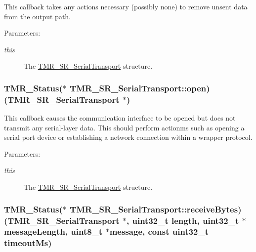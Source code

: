This callback takes any actions necessary (possibly none) to remove unsent data from the output path.

\begin{Desc}
\item[Parameters:]
\begin{description}
\item[{\em this}]The \hyperlink{struct_t_m_r___s_r___serial_transport}{TMR\_\-SR\_\-SerialTransport} structure. \end{description}
\end{Desc}
\hypertarget{struct_t_m_r___s_r___serial_transport_4971afd7c8e756b6a0ebb92a4a1997ac}{
\subsubsection[{open}]{\setlength{\rightskip}{0pt plus 5cm}TMR\_\-Status($\ast$ {\bf TMR\_\-SR\_\-SerialTransport::open})({\bf TMR\_\-SR\_\-SerialTransport} $\ast$)}}
\label{struct_t_m_r___s_r___serial_transport_4971afd7c8e756b6a0ebb92a4a1997ac}


This callback causes the communication interface to be opened but does not transmit any serial-layer data. This should perform actionms such as opening a serial port device or establishing a network connection within a wrapper protocol.

\begin{Desc}
\item[Parameters:]
\begin{description}
\item[{\em this}]The \hyperlink{struct_t_m_r___s_r___serial_transport}{TMR\_\-SR\_\-SerialTransport} structure. \end{description}
\end{Desc}
\hypertarget{struct_t_m_r___s_r___serial_transport_8998fa4c7b87786dbd5814d6c4ae5c94}{
\subsubsection[{receiveBytes}]{\setlength{\rightskip}{0pt plus 5cm}TMR\_\-Status($\ast$ {\bf TMR\_\-SR\_\-SerialTransport::receiveBytes})({\bf TMR\_\-SR\_\-SerialTransport} $\ast$, uint32\_\-t length, uint32\_\-t $\ast$messageLength, uint8\_\-t $\ast$message, const uint32\_\-t timeoutMs)}}
\label{struct_t_m_r___s_r___serial_transport_8998fa4c7b87786dbd5814d6c4ae5c94}


